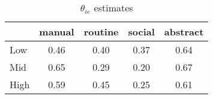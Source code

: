 \begin{table}[htbp]\centering \caption{$\theta_{ie}$ estimates} \begin{tabular}{l*{4}{c}} \toprule
            &      manual&     routine&      social&    abstract\\
\midrule
Low         &        0.46&        0.40&        0.37&        0.64\\
Mid         &        0.65&        0.29&        0.20&        0.67\\
High        &        0.59&        0.45&        0.25&        0.61\\
\bottomrule
\end{tabular}
\end{table}

